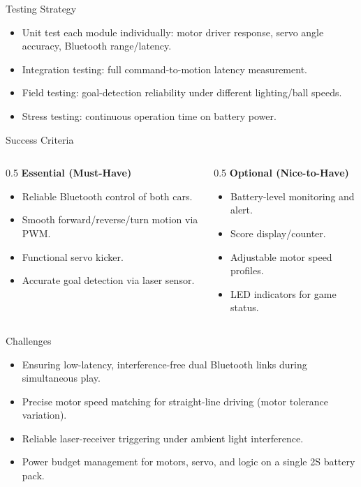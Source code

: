 \documentclass[aspectratio=169]{beamer}
\begin{document}
\begin{frame}{Testing Strategy}
  \begin{itemize}
    \item Unit test each module individually: motor driver response, servo angle accuracy, Bluetooth range/latency.
    \item Integration testing: full command-to-motion latency measurement.
    \item Field testing: goal-detection reliability under different lighting/ball speeds.
    \item Stress testing: continuous operation time on battery power.
  \end{itemize}
\end{frame}

\begin{frame}{Success Criteria}
  \begin{columns}[T]
    \begin{column}{0.5\textwidth}
      \textbf{Essential (Must-Have)}
      \begin{itemize}
        \item Reliable Bluetooth control of both cars.
        \item Smooth forward/reverse/turn motion via PWM.
        \item Functional servo kicker.
        \item Accurate goal detection via laser sensor.
      \end{itemize}
    \end{column}
    \begin{column}{0.5\textwidth}
      \textbf{Optional (Nice-to-Have)}
      \begin{itemize}
        \item Battery-level monitoring and alert.
        \item Score display/counter.
        \item Adjustable motor speed profiles.
        \item LED indicators for game status.
      \end{itemize}
    \end{column}
  \end{columns}
\end{frame}

\begin{frame}{Challenges}
  \begin{itemize}
    \item Ensuring low-latency, interference-free dual Bluetooth links during simultaneous play.
    \item Precise motor speed matching for straight-line driving (motor tolerance variation).
    \item Reliable laser-receiver triggering under ambient light interference.
    \item Power budget management for motors, servo, and logic on a single 2S battery pack.
  \end{itemize}
\end{frame}
\end{document}
